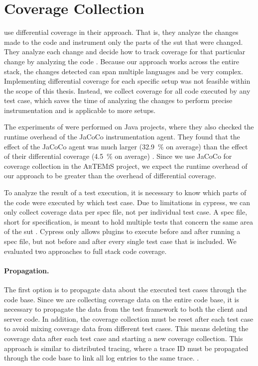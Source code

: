 \section{Coverage Collection}
 use differential coverage in their approach.
That is, they analyze the changes made to the code and instrument only the parts of the \ac{sut} that were changed.
They analyze each change and decide how to track coverage for that particular change by analyzing the code \autocite{bell_deflaker_2018}.
Because our approach works across the entire stack, the changes detected can span multiple languages and be very complex.
Implementing differential coverage for each specific setup was not feasible within the scope of this thesis.
Instead, we collect coverage for all code executed by any test case, which saves the time of analyzing the changes to perform precise instrumentation and is applicable to more setups.

The experiments of \citeauthor*{bell_deflaker_2018} were performed on Java projects, where they also checked the runtime overhead of the JaCoCo instrumentation agent.
They found that the effect of the JaCoCo agent was much larger (\SI{32.9}{\percent} on average) than the effect of their differential coverage (\SI{4.5}{\percent} on average) \autocite{bell_deflaker_2018}.
Since we use JaCoCo for coverage collection in the \textsc{ArTEMiS} project, we expect the runtime overhead of our approach to be greater than the overhead of differential coverage.

To analyze the result of a test execution, it is necessary to know which parts of the code were executed by which test case.
Due to limitations in cypress, we can only collect coverage data per spec file, not per individual test case.
A spec file, short for specification, is meant to hold multiple tests that concern the same area of the \ac{sut} \autocite{noauthor_writing_nodate}.
Cypress only allows plugins to execute before and after running a spec file, but not before and after every single test case that is included.
We evaluated two approaches to full stack code coverage.

\paragraph{Propagation.} The first option is to propagate data about the executed test cases through the code base.
Since we are collecting coverage data on the entire code base, it is necessary to propagate the data from the test framework to both the client and server code.
In addition, the coverage collection must be reset after each test case to avoid mixing coverage data from different test cases.
This means deleting the coverage data after each test case and starting a new coverage collection.
This approach is similar to distributed tracing, where a trace ID must be propagated through the code base to link all log entries to the same trace. \autocite{noauthor_distributed_nodate}.


